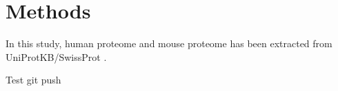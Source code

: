 \section{Methods}
In this study, human proteome and mouse proteome has been extracted from UniProtKB/SwissProt \cite{2007}. 


Test git push

